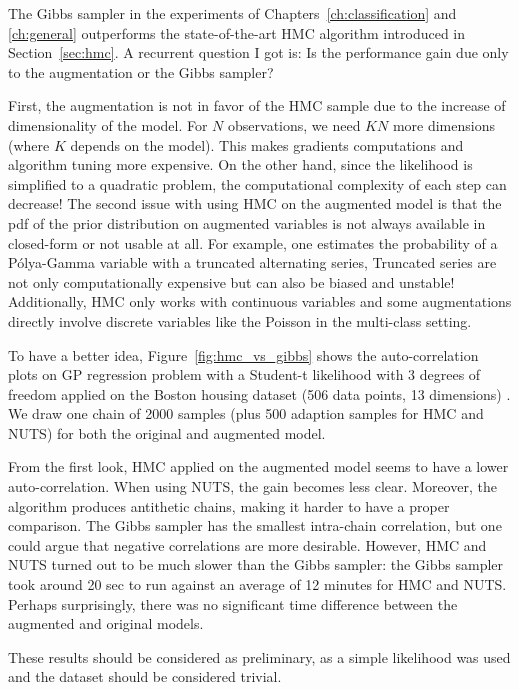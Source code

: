 The Gibbs sampler in the experiments of Chapters~\ref{ch:classification} and \ref{ch:general} outperforms the state-of-the-art \ac{HMC} algorithm introduced in Section~\ref{sec:hmc}.
A recurrent question I got is:
Is the performance gain due only to the augmentation or the Gibbs sampler?

First, the augmentation is not in favor of the \ac{HMC} sample due to the increase of dimensionality of the model.
For $N$ observations, we need $KN$ more dimensions (where $K$ depends on the model).
This makes gradients computations and algorithm tuning more expensive.
On the other hand, since the likelihood is simplified to a quadratic problem, the computational complexity of each step can decrease!
The second issue with using \ac{HMC} on the augmented model is that the \ac{pdf} of the prior distribution on augmented variables is not always available in closed-form or not usable at all.
For example, one estimates the probability of a P\'olya-Gamma variable with a truncated alternating series,
Truncated series are not only computationally expensive but can also be biased and unstable!
Additionally, \ac{HMC} only works with continuous variables and some augmentations directly involve discrete variables like the Poisson in the multi-class setting.

To have a better idea, Figure~\ref{fig:hmc_vs_gibbs} shows the auto-correlation plots on \ac{GP} regression problem with a Student-t likelihood with 3 degrees of freedom applied on the Boston housing dataset (506 data points, 13 dimensions) \cite{harrison1978hedonic}.
We draw one chain of 2000 samples (plus 500 adaption samples for \ac{HMC} and \ac{NUTS}) for both the original and augmented model.

From the first look, \ac{HMC} applied on the augmented model seems to have a lower auto-correlation.
When using \ac{NUTS}, the gain becomes less clear.
Moreover, the algorithm produces antithetic chains, making it harder to have a proper comparison.
The Gibbs sampler has the smallest intra-chain correlation, but one could argue that negative correlations are more desirable.
However, \ac{HMC} and \ac{NUTS} turned out to be much slower than the Gibbs sampler:
the Gibbs sampler took around 20 sec to run against an average of 12 minutes for \ac{HMC} and \ac{NUTS}.
Perhaps surprisingly, there was no significant time difference between the augmented and original models.

These results should be considered as preliminary, as a simple likelihood was used and the dataset should be considered trivial.

